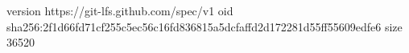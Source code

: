 version https://git-lfs.github.com/spec/v1
oid sha256:2f1d66fd71cf255c5ec56c16fd836815a5dcfaffd2d172281d55ff55609edfe6
size 36520
